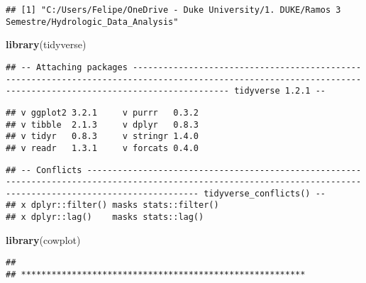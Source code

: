 \documentclass[]{article}
\newenvironment{Shaded}{\begin{snugshade}}{\end{snugshade}}
\newcommand{\DataTypeTok}[1]{\textcolor[rgb]{0.13,0.29,0.53}{#1}}
\newcommand{\KeywordTok}[1]{\textcolor[rgb]{0.13,0.29,0.53}{\textbf{#1}}}
\newcommand{\NormalTok}[1]{#1}
\newcommand{\OperatorTok}[1]{\textcolor[rgb]{0.81,0.36,0.00}{\textbf{#1}}}
\newcommand{\OtherTok}[1]{\textcolor[rgb]{0.56,0.35,0.01}{#1}}
\begin{document}
\begin{Shaded}
\end{Shaded}

\begin{verbatim}
## [1] "C:/Users/Felipe/OneDrive - Duke University/1. DUKE/Ramos 3 Semestre/Hydrologic_Data_Analysis"
\end{verbatim}

\begin{Shaded}
\begin{Highlighting}[]
\KeywordTok{library}\NormalTok{(tidyverse)}
\end{Highlighting}
\end{Shaded}

\begin{verbatim}
## -- Attaching packages --------------------------------------------------------------------------------------------------------------------------------------------------------------- tidyverse 1.2.1 --
\end{verbatim}

\begin{verbatim}
## v ggplot2 3.2.1     v purrr   0.3.2
## v tibble  2.1.3     v dplyr   0.8.3
## v tidyr   0.8.3     v stringr 1.4.0
## v readr   1.3.1     v forcats 0.4.0
\end{verbatim}

\begin{verbatim}
## -- Conflicts ------------------------------------------------------------------------------------------------------------------------------------------------------------------ tidyverse_conflicts() --
## x dplyr::filter() masks stats::filter()
## x dplyr::lag()    masks stats::lag()
\end{verbatim}

\begin{Shaded}
\begin{Highlighting}[]
\KeywordTok{library}\NormalTok{(cowplot)}
\end{Highlighting}
\end{Shaded}

\begin{verbatim}
## 
## ********************************************************
\end{verbatim}
\end{document}
